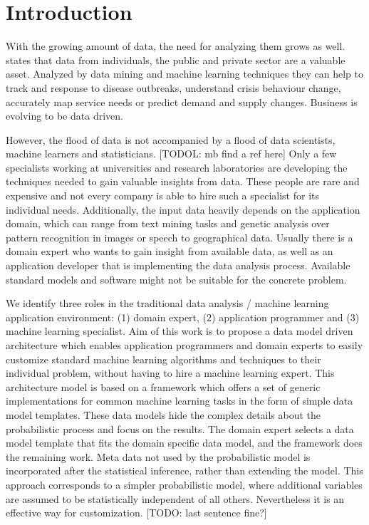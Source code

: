 \section{Introduction}

With the growing amount of data, the need for analyzing them grows as well. \textcite{forum2012bigdata} states that data from individuals, the public and private sector are a valuable asset. Analyzed by data mining and machine learning techniques they can help to track and response to disease outbreaks, understand crisis behaviour change, accurately map service needs or predict demand and supply changes. Business is evolving to be data driven.

However, the flood of data is not accompanied by a flood of data scientists, machine learners and statisticians. [TODOL: mb find a ref here] Only a few specialists working at universities and research laboratories are developing the techniques needed to gain valuable insights from data. These people are rare and expensive and not every company is able to hire such a specialist for its individual needs. Additionally, the input data heavily depends on the application domain, which can range from text mining tasks and genetic analysis over pattern recognition in images or speech to geographical data. Usually there is a domain expert who wants to gain insight from available data, as well as an application developer that is implementing the data analysis process. Available standard models and software might not be suitable for the concrete problem.

We identify three roles in the traditional data analysis / machine learning application environment: (1) domain expert, (2) application programmer and (3) machine learning specialist. Aim of this work is to propose a data model driven architecture which enables application programmers and domain experts to easily customize standard machine learning algorithms and techniques to their individual problem, without having to hire a machine learning expert. This architecture model is based on a framework which offers a set of generic implementations for common machine learning tasks in the form of simple data model templates. These data models hide the complex details about the probabilistic process and focus on the results. The domain expert selects a data model template that fits the domain specific data model, and the framework does the remaining work. Meta data not used by the probabilistic model is incorporated after the statistical inference, rather than extending the model. This approach corresponds to a simpler probabilistic model, where additional variables are assumed to be statistically independent of all others. Nevertheless it is an effective way for customization. [TODO: last sentence fine?]

